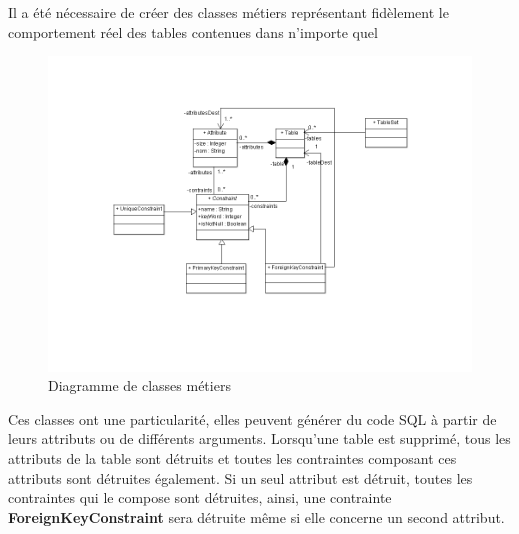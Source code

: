 Il a été nécessaire de créer des classes métiers représentant fidèlement le comportement réel des tables contenues dans n'importe quel \sgbd

\begin{figure}[!h]
\centering
\includegraphics[width=18cm]{images/metier.png}
\caption{Diagramme de classes métiers}
\label{classes_metiers}
\end{figure}


Ces classes ont une particularité, elles peuvent générer du code SQL à partir de leurs attributs ou de différents arguments.
Lorsqu'une table est supprimé, tous les attributs de la table sont détruits et toutes les contraintes composant ces attributs sont détruites également.
Si un seul attribut est détruit, toutes les contraintes qui le compose sont détruites, ainsi, une contrainte \textbf{ForeignKeyConstraint} sera détruite même si elle concerne un second attribut.
